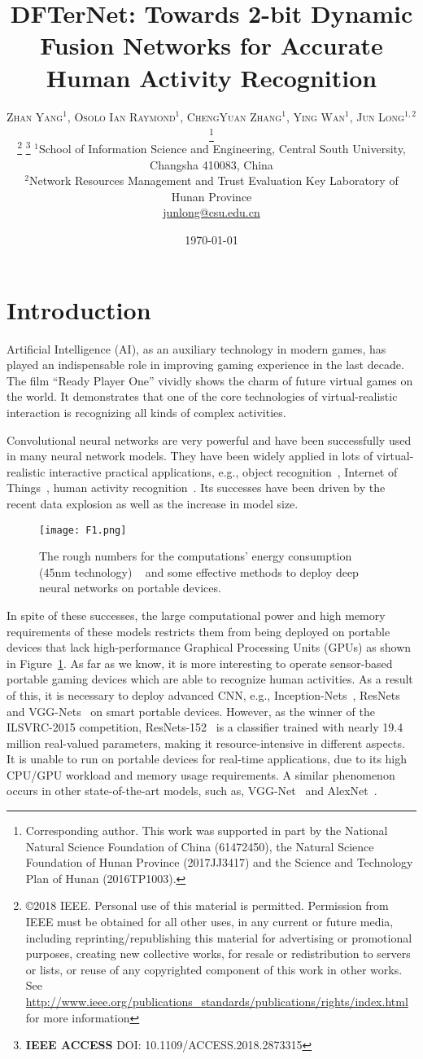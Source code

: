 \documentclass[twoside,twocolumn]{article}
\title{DFTerNet: Towards 2-bit Dynamic Fusion Networks for Accurate Human Activity Recognition} %
\author{%
\textsc{Zhan Yang$^1$, Osolo Ian Raymond$^1$, ChengYuan Zhang$^1$, Ying Wan$^1$, Jun Long$^{1,2}$}\thanks{Corresponding author. This work was supported in part by the National Natural Science Foundation of China (61472450), the Natural Science Foundation of Hunan Province (2017JJ3417) and the Science and Technology Plan of Hunan (2016TP1003).} \\[1ex] %
\thanks{\copyright 2018 IEEE. Personal use of this material is permitted. Permission
from IEEE must be obtained for all other uses, in any current or future
media, including reprinting/republishing this material for advertising or
promotional purposes, creating new collective works, for resale or
redistribution to servers or lists, or reuse of any copyrighted
component of this work in other works. See \url{http://www.ieee.org/publications_standards/publications/rights/index.html} for more information}
\thanks{\textbf{IEEE ACCESS} DOI: 10.1109/ACCESS.2018.2873315}
\normalsize $^1$School of Information Science and Engineering, Central South University, Changsha 410083, China \\ %
\normalsize $^2$Network Resources Management and Trust Evaluation Key Laboratory of Hunan Province \\ %
\normalsize \href{mailto:junlong@csu.edu.cn}{junlong@csu.edu.cn} %
}
\date{\today} %
\begin{document}
\maketitle


\section{Introduction}
\label{sec:introduction}
Artificial Intelligence (AI), as an auxiliary technology in modern games, has played an indispensable role in improving gaming experience in the last decade. The film ``Ready Player One'' vividly shows the charm of future virtual games on the world. It demonstrates that one of the core technologies of virtual-realistic interaction is recognizing all kinds of complex activities.

Convolutional neural networks are very powerful and have been successfully used in many neural network models. They have been widely applied in lots of virtual-realistic interactive practical applications, e.g., object recognition~\cite{b1,b2,b3}, Internet of Things~\cite{b4,b5}, human activity recognition~\cite{b6,b7}. Its successes have been driven by the recent data explosion as well as the increase in model size.

\begin{figure}
  \centering
  \texttt{[image: F1.png]}\\
  \caption{The rough numbers for the computations' energy consumption (45nm technology) ~\cite{b8} and some effective methods to deploy deep neural networks on portable devices.}\label{fig:F1}
\end{figure}

In spite of these successes, the large computational power and high memory requirements of these models restricts them from being deployed on portable devices that lack high-performance Graphical Processing Units (GPUs) as shown in Figure~\ref{fig:F1}. As far as we know, it is more interesting to operate sensor-based portable gaming devices which are able to recognize human activities. As a result of this, it is necessary to deploy advanced CNN, e.g., Inception-Nets~\cite{b9}, ResNets~\cite{b10} and VGG-Nets~\cite{b11} on smart portable devices. However, as the winner of the ILSVRC-2015 competition, ResNets-152~\cite{b10} is a classifier trained with nearly 19.4 million real-valued parameters, making it resource-intensive in different aspects. It is unable to run on portable devices for real-time applications, due to its high CPU/GPU workload and memory usage requirements. A similar phenomenon occurs in other state-of-the-art models, such as, VGG-Net~\cite{b11} and AlexNet~\cite{b12}.
\end{document}
